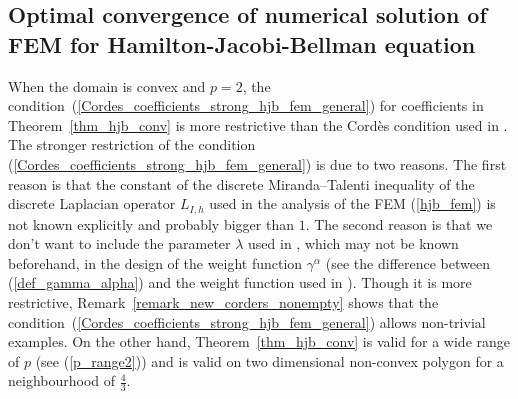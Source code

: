 \documentclass[12pt]{amsart}
\theoremstyle{definition}
\theoremstyle{remark}
\begin{document}
\subsection{Optimal convergence of numerical solution of FEM for Hamilton-Jacobi-Bellman equation}

When the domain is convex and $p=2$,  the condition~(\ref{Cordes_coefficients_strong_hjb_fem_general}) 
for coefficients in Theorem~\ref{thm_hjb_conv} is more restrictive than the Cord{\`{e}}s condition 
used in \cite{SmearsSuli2014}. The stronger restriction of the condition 
(\ref{Cordes_coefficients_strong_hjb_fem_general}) is due to two reasons. The first reason 
is that the constant of the discrete Miranda–Talenti inequality of the discrete Laplacian operator 
$L_{I,h}$ used in the analysis of the FEM (\ref{hjb_fem}) 
is not known explicitly and probably bigger than $1$. The second reason is that we don't want to include 
the parameter $\lambda$ used in \cite{SmearsSuli2014}, which may not be known beforehand, in the design of the 
weight function $\gamma^{\alpha}$ (see the difference between (\ref{def_gamma_alpha}) and the weight function 
used in \cite{SmearsSuli2014}). Though it is more restrictive, Remark~\ref{remark_new_corders_nonempty} 
shows that the condition~(\ref{Cordes_coefficients_strong_hjb_fem_general}) allows non-trivial examples.  
On the other hand, Theorem~\ref{thm_hjb_conv} is valid for a wide range of $p$ (see (\ref{p_range2})) 
and is valid on two dimensional non-convex polygon for a neighbourhood of $\frac{4}{3}$. 
\end{document}
